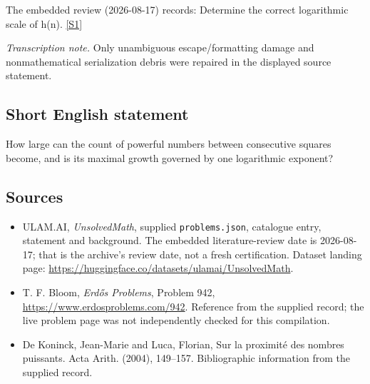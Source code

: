 \documentclass[11pt,a4paper]{article}
\newcommand{\sref}[2]{\hyperlink{source:#1:#2}{[S#2]}}
\begin{document}
The embedded review (2026-08-17) records: Determine the correct logarithmic scale of h(n). \sref{statement}{1}

{\small\emph{Transcription note.} Only unambiguous escape/formatting damage and nonmathematical serialization debris were repaired in the displayed source statement.}

\subsection{Short English statement}

How large can the count of powerful numbers between consecutive squares become, and is its maximal growth governed by one logarithmic exponent?

\subsection{Sources}

{\small

\begin{itemize}

\item[\hypertarget{source:statement:1}{S1}] ULAM.AI, \emph{UnsolvedMath}, supplied \texttt{problems.json}, catalogue entry, statement and background. The embedded literature-review date is 2026-08-17; that is the archive’s review date, not a fresh certification. Dataset landing page: \url{https://huggingface.co/datasets/ulamai/UnsolvedMath}.

\item[\hypertarget{source:statement:2}{S2}] T. F. Bloom, \emph{Erdős Problems}, Problem 942, \url{https://www.erdosproblems.com/942}. Reference from the supplied record; the live problem page was not independently checked for this compilation.

\item[\hypertarget{source:statement:3}{S3}] De Koninck, Jean-Marie and Luca, Florian, Sur la proximit\'{e} des nombres puissants. Acta Arith. (2004), 149--157. Bibliographic information from the supplied record.

\end{itemize}

}

\label{end:statement}
\end{document}

